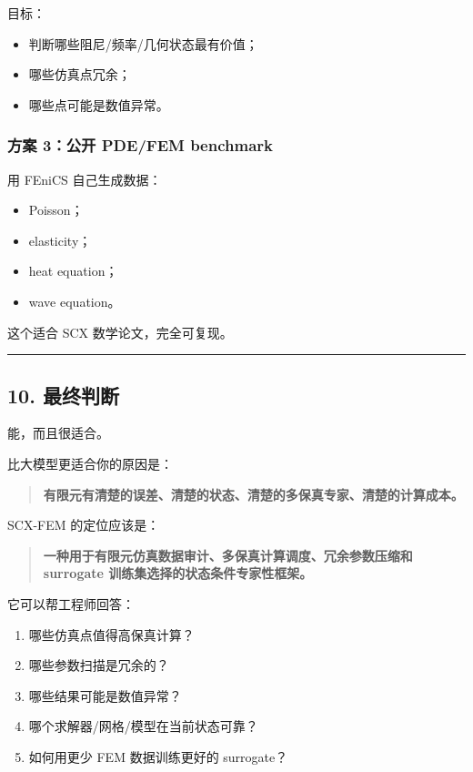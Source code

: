 \documentclass[
  12pt,
]{ctexart}
\providecommand{\tightlist}{%
  \setlength{\itemsep}{0pt}\setlength{\parskip}{0pt}}
\begin{document}
目标：

\begin{itemize}
\tightlist
\item
  判断哪些阻尼/频率/几何状态最有价值；
\item
  哪些仿真点冗余；
\item
  哪些点可能是数值异常。
\end{itemize}

\subsubsection{方案 3：公开 PDE/FEM
benchmark}\label{ux65b9ux6848-3ux516cux5f00-pdefem-benchmark}

用 FEniCS 自己生成数据：

\begin{itemize}
\tightlist
\item
  Poisson；
\item
  elasticity；
\item
  heat equation；
\item
  wave equation。
\end{itemize}

这个适合 SCX 数学论文，完全可复现。

\begin{center}\rule{0.5\linewidth}{0.5pt}\end{center}

\subsection{10. 最终判断}\label{ux6700ux7ec8ux5224ux65ad-7}

能，而且很适合。

比大模型更适合你的原因是：

\begin{quote}
\textbf{有限元有清楚的误差、清楚的状态、清楚的多保真专家、清楚的计算成本。}
\end{quote}

SCX-FEM 的定位应该是：

\begin{quote}
\textbf{一种用于有限元仿真数据审计、多保真计算调度、冗余参数压缩和
surrogate 训练集选择的状态条件专家性框架。}
\end{quote}

它可以帮工程师回答：

\begin{enumerate}
\def\labelenumi{\arabic{enumi}.}
\tightlist
\item
  哪些仿真点值得高保真计算？
\item
  哪些参数扫描是冗余的？
\item
  哪些结果可能是数值异常？
\item
  哪个求解器/网格/模型在当前状态可靠？
\item
  如何用更少 FEM 数据训练更好的 surrogate？
\end{enumerate}
\end{document}
